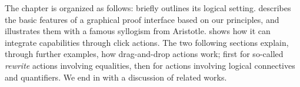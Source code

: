 \begin{scope}
The chapter is organized as follows:  briefly outlines its
logical setting.  describes the basic features of a graphical
proof interface based on our principles, and illustrates them with a famous
syllogism from Aristotle.  shows how it can integrate
 capabilities through click actions. The two following
sections explain, through further examples, how drag-and-drop actions work;
first for so-called \emph{rewrite} actions involving equalities, then for
actions involving logical connectives and quantifiers. We end in 
with a discussion of related works.






\end{scope}
